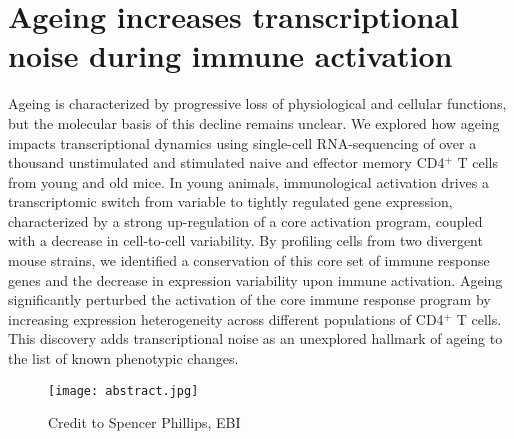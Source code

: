 
\chapter{Ageing increases transcriptional noise during immune activation}  

\graphicspath{{Chapter1/Figures/}}

\begin{Abstract}
Ageing is characterized by progressive loss of physiological and cellular functions, but the molecular basis of this decline remains unclear. We explored how ageing impacts transcriptional dynamics using single-cell RNA-sequencing of over a thousand unstimulated and stimulated naive and effector memory CD4$^+$ T cells from young and old mice. In young animals, immunological activation drives a transcriptomic switch from variable to tightly regulated gene expression, characterized by a strong up-regulation of a core activation program, coupled with a decrease in cell-to-cell variability. By profiling cells from two divergent mouse strains, we identified a conservation of this core set of immune response genes and the decrease in expression variability upon immune activation. Ageing significantly perturbed the activation of the core immune response program by increasing expression heterogeneity across different populations of CD4$^+$ T cells. This discovery adds transcriptional noise as an unexplored hallmark of ageing to the list of known phenotypic changes.
\end{Abstract}

\begin{figure}[hb]
\centering    
\texttt{[image: abstract.jpg]}
\vspace*{-10mm}
\caption*{Credit to Spencer Phillips, EBI}
\end{figure}

\newpage

